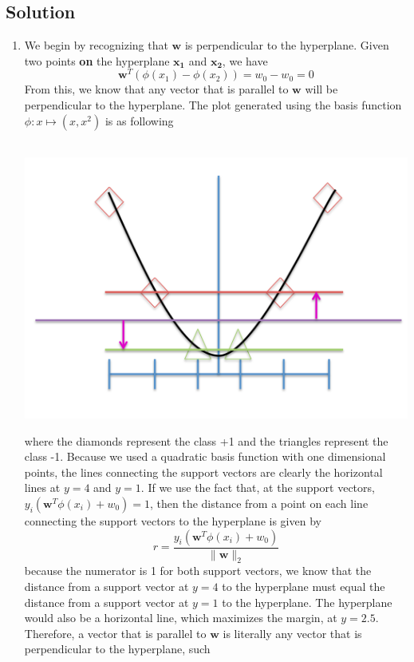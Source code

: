 \documentclass[submit]{harvardml}
\begin{document}
\subsection*{Solution}
\begin{enumerate}
	\item We begin by recognizing that $\mathbf{w}$ is perpendicular to the hyperplane. Given two points
		\textbf{on} the hyperplane $\mathbf{x_1}$ and $\mathbf{x_2}$, we have 
			$$\mathbf{w}^T(\phi(x_1) - \phi(x_2)) = w_0 - w_0 = 0$$
		From this, we know that any vector that is parallel to $\mathbf{w}$ will be perpendicular to the 
		hyperplane. The plot generated using the basis function $\phi: x \mapsto(x,x^2)$ is as following\\ \\
			\centerline{\includegraphics[scale=0.3]{./ayy}}
		where the diamonds represent the class +1 and the triangles represent the class -1. Because we used 
		a quadratic basis function with one dimensional points, the lines connecting the support vectors are 
		clearly the horizontal lines	at $ y = 4$ and $y = 1$. If we use the fact that, at the support vectors, 
		$y_i(\mathbf{w}^T\phi(x_i) + w_0) = 1$, 
		then the distance from a point on each line connecting the support vectors to the hyperplane is given by 
			$$ r = \frac{y_i(\mathbf{w}^T\phi(x_i) + w_0)}{\| \mathbf{w} \|_2}$$
		because the numerator is 1 for both support vectors, we know that the distance from a support vector 
		at $y = 4$ to the hyperplane must equal the distance from a support vector at $y = 1$ to the hyperplane.
		The hyperplane would also be a horizontal line, which maximizes the margin, at $y = 2.5$. Therefore, 
		a vector that is parallel to $\mathbf{w}$ is literally any vector that is perpendicular to the hyperplane, such 

\end{enumerate}
\end{document}
